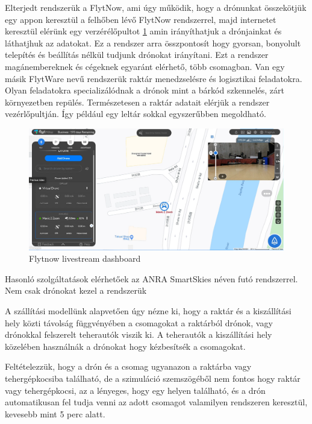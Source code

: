Elterjedt rendszerük a FlytNow, ami úgy működik, hogy a drónunkat összekötjük egy appon keresztül a felhőben lévő FlytNow rendszerrel,
majd internetet keresztül elérünk egy verzérélőpultot \ref{fig:flytdash} amin irányíthatjuk a drónjainkat és láthatjhuk az adatokat.
Ez a rendszer arra összpontosít hogy gyorsan, bonyolult telepítés és beállítás nélkül tudjunk drónokat irányítani.
Ezt a rendszer magánembereknek és cégeknek egyaránt elérhető, több csomagban.
Van egy másik FlytWare nevű rendszerük raktár menedzselésre és logisztikai feladatokra. Olyan feladatokra specializálódnak a drónok mint a bárkód szkennelés,
zárt környezetben repülés. Természetesen a raktár adatait elérjük a rendszer vezérlőpultján. Így például egy leltár sokkal egyszerűbben megoldható.


\begin{figure}[h]
    \centering
    \includegraphics[scale=0.3]{images/flyt-dashboard.png}
    \caption{Flytnow livestream dashboard}
    \label{fig:flytdash}
\end{figure}

Hasonló szolgáltatások elérhetőek az ANRA SmartSkies néven futó rendszerrel. Nem csak drónokat kezel a rendszerük



A szállítási modellünk alapvetően úgy nézne ki, hogy a raktár és a kiszállítási hely közti távolság függvényében a csomagokat a raktárból drónok, vagy drónokkal felszerelt teherautók viszik ki.
A teherautók a kiszállítási hely közelében használnák a drónokat hogy kézbesítsék a csomagokat.

Feltételezzük, hogy a drón és a csomag ugyanazon a raktárba vagy tehergépkocsiba található, de a szimuláció szemszögéből nem fontos hogy raktár vagy tehergépkocsi, az a lényeges, hogy egy helyen található, és a drón automatikusan fel tudja venni az adott csomagot
valamilyen rendszeren keresztül, kevesebb mint 5 perc alatt.

